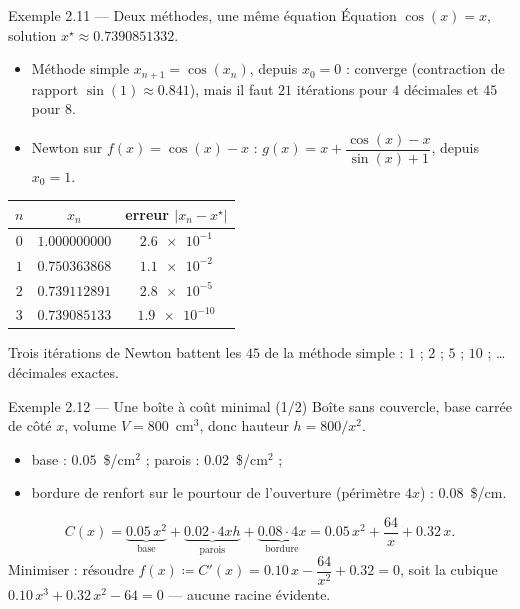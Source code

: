 \begin{frame}{Exemple 2.11 --- Deux méthodes, une même équation}
  \small Équation $\cos(x)=x$, solution $x^\star\approx\num{0.7390851332}$.
  \begin{itemize}
    \item Méthode simple $x_{n+1}=\cos(x_n)$, depuis $x_0=0$ :
      converge (contraction de rapport $\sin(1)\approx\num{0.841}$), mais
      il faut $21$ itérations pour $4$ décimales et $45$ pour $8$.
    \item Newton sur $f(x)=\cos(x)-x$ :
      $g(x) = x+\dfrac{\cos(x)-x}{\sin(x)+1}$, depuis $x_0=1$.
  \end{itemize}
  \begin{center}
  \begin{tabular}{ccc}
    \toprule
    $n$ & $x_n$ & erreur $|x_n-x^\star|$ \\
    \midrule
    $0$ & $\num{1.000000000}$ & $\num{2.6e-1}$ \\
    $1$ & $\num{0.750363868}$ & $\num{1.1e-2}$ \\
    $2$ & $\num{0.739112891}$ & $\num{2.8e-5}$ \\
    $3$ & $\num{0.739085133}$ & $\num{1.9e-10}$ \\
    \bottomrule
  \end{tabular}
  \end{center}
  \small Trois itérations de Newton battent les $45$ de la méthode simple :
  $1$ ; $2$ ; $5$ ; $10$ ; … décimales exactes.
\end{frame}

\begin{frame}{Exemple 2.12 --- Une boîte à coût minimal (1/2)}
  \small Boîte sans couvercle, base carrée de côté $x$, volume
  $V=800$~cm$^3$, donc hauteur $h=800/x^2$.
  \begin{itemize}
    \item base : $\num{0.05}$~\$/cm$^2$ ; parois : $\num{0.02}$~\$/cm$^2$ ;
    \item bordure de renfort sur le pourtour de l'ouverture (périmètre
      $4x$) : $\num{0.08}$~\$/cm.
  \end{itemize}
  \[
    C(x) = \underbrace{\num{0.05}\,x^2}_{\text{base}}
    + \underbrace{\num{0.02}\cdot4xh}_{\text{parois}}
    + \underbrace{\num{0.08}\cdot4x}_{\text{bordure}}
    = \num{0.05}\,x^2 + \frac{64}{x} + \num{0.32}\,x.
  \]
  Minimiser : résoudre
  $f(x)\coloneqq C'(x) = \num{0.10}\,x - \dfrac{64}{x^2} + \num{0.32} = 0$,
  soit la cubique $\num{0.10}\,x^3+\num{0.32}\,x^2-64=0$ --- aucune racine
  évidente.
\end{frame}

